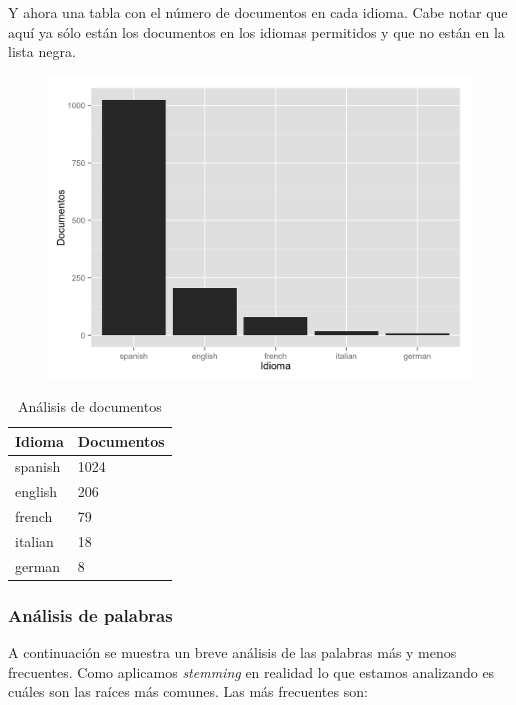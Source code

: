 Y ahora una tabla con el número de documentos en cada idioma. Cabe notar
que aquí ya sólo están los documentos en los idiomas permitidos y que no
están en la lista negra.

\begin{figure}[H]
\centering
\includegraphics[width=1\textwidth]{Figures/L2.png}
\caption{}
\label{}
\end{figure}

\begin{table}[]
\centering
\begin{tabular}{@{}ll@{}}
\toprule
\textbf{Idioma} & \textbf{Documentos} \\ \midrule
spanish         & 1024                \\
english         & 206                 \\
french          & 79                  \\
italian         & 18                  \\
german          & 8                   \\ \bottomrule
\end{tabular}
\caption{Análisis de documentos}
\label{my-label}
\end{table}


\subsubsection{Análisis de palabras}\label{analisis-de-palabras}

A continuación se muestra un breve análisis de las palabras más y menos
frecuentes. Como aplicamos \emph{stemming} en realidad lo que estamos
analizando es cuáles son las raíces más comunes. Las más frecuentes son:

